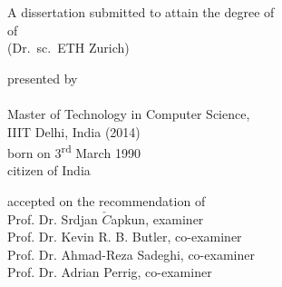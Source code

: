\begin{titlepage}
    \begin{center}
        \large
        \begingroup
        \endgroup

        \hfill

        \vfill

        \begingroup
            \spacedallcaps{\myTitle}
        \endgroup

        \vfill

        \begingroup
            A dissertation submitted to attain the degree of\\
            \vspace{0.5em}
            of
             \\
            (Dr.\ sc.\ ETH Zurich)
        \endgroup

        \vfill

        \begingroup
            presented by\\
            \vspace{0.5em}
            \spacedallcaps{\myName}\\\vspace{0.5em}
            Master of Technology in Computer Science,\\ IIIT Delhi, India (2014)\\
            \vspace{0.5em}
            born on 3\textsuperscript{rd} March 1990\\
            citizen of India
        \endgroup

        \vfill

        \begingroup
            accepted on the recommendation of\\
            \vspace{0.5em}
            Prof. Dr. Srdjan $\check{C}$apkun, examiner\\
			Prof. Dr. Kevin R. B. Butler, co-examiner\\
			Prof. Dr. Ahmad-Reza Sadeghi, co-examiner\\
			Prof. Dr. Adrian Perrig, co-examiner
        \endgroup

        \vfill

        \myTime%

        \vfill
    \end{center}
\end{titlepage}
